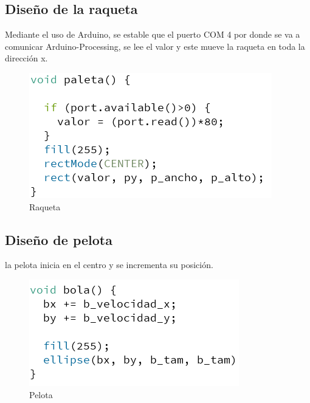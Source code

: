 \documentclass[10pt,a4paper]{article}
\begin{document}
\subsection{Diseño de la raqueta}
Mediante el uso de Arduino, se estable que el puerto COM 4 por donde se va a comunicar Arduino-Processing, se lee el valor y este mueve la raqueta en toda la dirección x.
\begin{figure}[H]
\centering
\includegraphics[scale=0.5]{raqueta.PNG}
\caption{Raqueta}
\end{figure}





\subsection{Diseño de pelota}
la pelota inicia en el centro y se incrementa su posición.
\begin{figure}[H]
\centering
\includegraphics[scale=0.5]{bola.PNG}
\caption{Pelota}
\end{figure}
\end{document}
